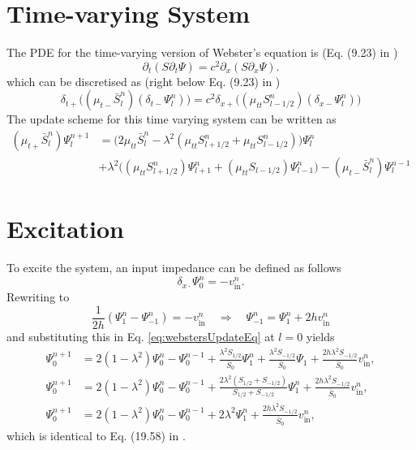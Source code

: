 \documentclass[dvipsnames]{article}
\def\dxp{\delta_{x+}}
\def\dxm{\delta_{x-}}
\def\Sp{S_{l+1/2}}
\def\Sm{S_{l-1/2}}
\def\Psilp{\Psi_{l+1}^n}
\def\Psilm{\Psi_{l-1}^n}
\def\Psinp{\Psi_l^{n+1}}
\def\Psinm{\Psi_l^{n-1}}
\def\Psiln{\Psi_l^n}
\def\muTT{\mu_{tt}}
\begin{document}
\section{Time-varying System}
The PDE for the time-varying version of Webster's equation is (Eq. (9.23) in \cite{Bilbao2009})
\begin{equation}
     \partial_t(S\partial_t\Psi) = c^2 \partial_x(S\partial_x\Psi).
\end{equation}
which can be discretised as (right below Eq. (9.23) in \cite{Bilbao2009})
\begin{equation}
    \delta_{t+}\big((\mu_{t-}\bar S_l^n)(\delta_{t-}\Psiln)\big) = c^2\dxp\big((\muTT \Sm^n)(\dxm\Psiln)\big)
\end{equation}
The update scheme for this time varying system can be written as
\begin{equation}
    \begin{aligned}
        (\mu_{t+}\bar S_l^n)\Psinp &= \Big(2 \mu_{tt}\bar S_l^n -  \lambda^2(\muTT \Sp^n + \muTT \Sm^n)\Big) \Psiln \\
        &+ \lambda^2 \Big((\muTT \Sp^n)\Psilp + (\muTT\Sm)\Psilm\Big) - (\mu_{t-}\bar S_l^n)\Psinm
    \end{aligned}
\end{equation}

\section{Excitation}
To excite the system, an input impedance can be defined as follows
\begin{equation}
\delta_{x\cdot}\Psi_0^n = -v_\text{in}^n.
\end{equation} 
Rewriting to
\begin{equation}
    \frac{1}{2h}(\Psi_1^n-\Psi_{-1}^n) = -v_\text{in}^n \quad \Rightarrow \quad \Psi_{-1}^n = \Psi_1^n + 2hv_\text{in}^n
\end{equation}
and substituting this in Eq. \eqref{eq:webstersUpdateEq} at $l=0$ yields
\begin{align}
    \Psi_0^{n+1}&= 2(1-\lambda^2)\Psi_0^n-\Psi_0^{n-1}+ \frac{\lambda^2S_{1/2}}{\bar S_0}\Psi_1^n + \frac{\lambda^2S_{-1/2}}{\bar S_0}\Psi_1 + \frac{2h\lambda^2S_{-1/2}}{\bar S_0}v_\text{in}^n,\nonumber\\
    \Psi_0^{n+1}&= 2(1-\lambda^2)\Psi_0^n-\Psi_0^{n-1}+ \frac{2\lambda^2(S_{1/2}+S_{-1/2})}{S_{1/2}+S_{-1/2}}\Psi_1^n+ \frac{2h\lambda^2S_{-1/2}}{\bar S_0}v_\text{in}^n,\nonumber\\
    \Psi_0^{n+1}&= 2(1-\lambda^2)\Psi_0^n-\Psi_0^{n-1}+ 2\lambda^2\Psi_1^n+ \frac{2h\lambda^2S_{-1/2}}{\bar S_0}v_\text{in}^n,
\end{align}
which is identical to Eq. (19.58) in \cite{Bilbao2018}.
\end{document}
